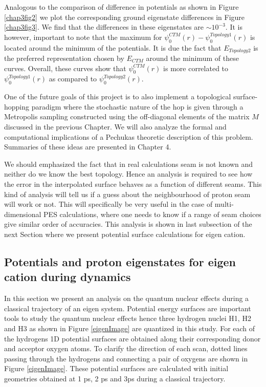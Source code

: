 Analogous to the comparison of difference in potentials as shown in Figure \ref{chap3fig2} we plot the corresponding
ground eigenstate differences in Figure \ref{chap3fig3}. We find that the differences in these eigenstates are
$\sim 10^{-3}$. It is however, important to note that the maximum for
$\psi_{0}^{CTM}(r)-\psi_{0}^{Topology1}(r)$ is located around the minimum of the potentials. It is due the fact that
$E_{Topology2}$ is the preferred representation chosen by $E_{CTM}$ around the minimum of these curves. Overall, these
curves show that $\psi_{0}^{CTM}(r)$ is more correlated to $\psi_{0}^{Topology1}(r)$ as compared to
$\psi_{0}^{Topology2}(r)$.

One of the future goals of this project is to also implement a topological surface-hopping
paradigm where the stochastic nature of the hop is given through a Metropolis sampling
constructed using the off-diagonal elements of the matrix $M$ discussed in the previous Chapter.
We will also analyze the formal and computational implications of a Pechukas theoretic
description of this problem. Summaries of these ideas are presented in Chapter 4.

We should emphasized the fact that in real calculations seam is not known and neither do we know
the best topology. Hence an analysis is required to see how the error in the interpolated surface behaves as a
function of different seams. This kind of analysis will tell us if a guess about the neighbourhood of
proton seam will work or not. This will specifically be very useful in the case of multi-dimensional PES
calculations, where one needs to know if a range of seam choices give similar order of accuracies. This analysis
is shown in last subsection of the next Section where we present potential surface calculations for eigen cation.

\subsection{Potentials and proton eigenstates for eigen cation during dynamics}
{\label {eigenResults}}
In this section we present an analysis on the quantum nuclear effects during a classical trajectory of an eigen system.
Potential energy surfaces are important tools to study the quantum nuclear effects hence three hydrogen nuclei H1, H2
and H3 as shown in Figure \ref{eigenImage} are quantized in this study. For each of the hydrogens 1D potential surfaces
are obtained along their corresponding donor and acceptor oxygen atoms. To clarify the direction of each scan, dotted
lines passing through the hydrogens and connecting a pair of oxygens are shown in Figure \ref{eigenImage}. These
potential surfaces are calculated with initial geometries obtained at 1 ps, 2 ps and 3ps during a classical
trajectory.

